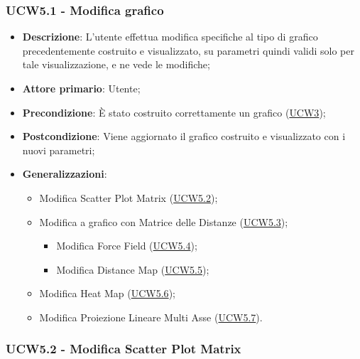 \newpage
\subsubsection{UCW5.1 - Modifica grafico}
\label{ssub:ucw5.1}

\begin{itemize}
    \item \textbf{Descrizione}: L’utente effettua modifica specifiche al tipo di grafico precedentemente costruito e visualizzato,
                                su parametri quindi validi solo per tale visualizzazione, e ne vede le modifiche;

    \item \textbf{Attore primario}: Utente;

    \item \textbf{Precondizione}:   È stato costruito correttamente un grafico (\hyperref[sub:ucw3]{UCW3});

    \item \textbf{Postcondizione}:  Viene aggiornato il grafico costruito e visualizzato con i nuovi parametri;

    \item \textbf{Generalizzazioni}:
        \begin{itemize}
            \item Modifica Scatter Plot Matrix (\hyperref[ssub:ucw5.2]{UCW5.2});
            \item Modifica a grafico con Matrice delle Distanze (\hyperref[ssub:ucw5.3]{UCW5.3});
            \begin{itemize}
                \item Modifica Force Field (\hyperref[ssub:ucw5.4]{UCW5.4});
                \item Modifica Distance Map (\hyperref[ssub:ucw5.5]{UCW5.5});
             \end{itemize}
            \item Modifica Heat Map (\hyperref[ssub:ucw5.6]{UCW5.6});
            \item Modifica Proiezione Lineare Multi Asse (\hyperref[ssub:ucw5.7]{UCW5.7}).
        \end{itemize}
\end{itemize}

\subsubsection{UCW5.2 - Modifica Scatter Plot Matrix}
\label{ssub:ucw5.2}

